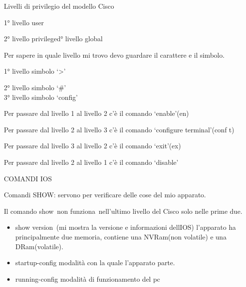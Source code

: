 \documentclass[
]{article}
\author{}
\date{}
\providecommand{\tightlist}{%
  \setlength{\itemsep}{0pt}\setlength{\parskip}{0pt}}
\begin{document}
{}

{Livelli di privilegio del modello Cisco}

{1° livello }{user}

{2° livello }{privileged}{\hfill{}° livello }{global}

{}

{Per sapere in quale livello mi trovo devo guardare il carattere e il
simbolo.}

{1° livello simbolo `}{\textgreater{}}{'}

{2° livello simbolo `}{\#}{'\\
3° livello simbolo }{`config'}

{}

{Per passare dal livello 1 al livello 2 c'è il comando }{`enable}{'(en)}

{Per passare dal livello 2 al livello 3 c'è il comando `}{configure
terminal}{'(conf t)}

{Per passare dal livello 3 al livello 2 c'è il comando `}{exit}{'(ex)}

{Per passare dal livello 2 al livello 1 c'è il comando `}{disable}{'}

{}

{COMANDI IOS}

{Comandi SHOW: servono per verificare delle cose del mio apparato.}

{Il comando show}{~non }{funziona}{~nell'ultimo livello del Cisco }{solo
nelle prime due}{.}

\begin{itemize}
\tightlist
\item
  {show version}{~(mi mostra la versione e informazioni
  dell\textquotesingle IOS) l'apparato ha principalmente due memoria,
  contiene una NVRam(non volatile) e una DRam(volatile).}
\end{itemize}

\begin{itemize}
\tightlist
\item
  {startup-config modalità con la quale l'apparato parte.}
\item
  {running-config modalità di funzionamento del pc}
\end{itemize}
\end{document}

